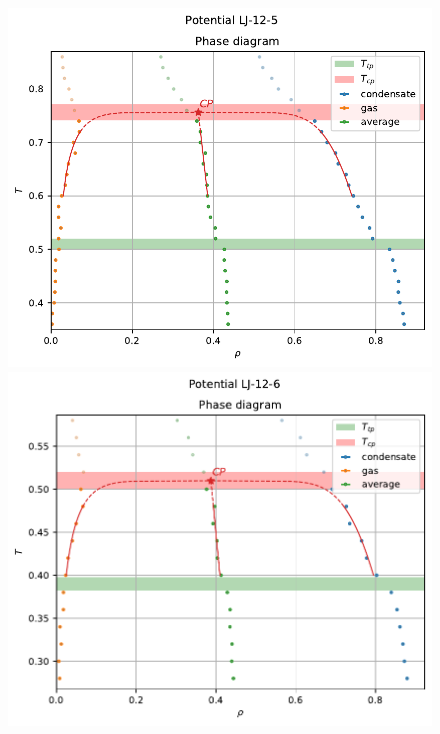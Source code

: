 \documentclass[pdf,hyperref={unicode}]{beamer}
\begin{document}
\begin{frame}
\begin{columns}
\begin{column}{0.55\linewidth}
\begin{figure}[h]
\begin{center}
\begin{minipage}[h]{0.47\linewidth}
\includegraphics[width=\textwidth, keepaspectratio]{plot_phase_diagram_Potential LJ-12-5_1}
\end{minipage}
\begin{minipage}[h]{0.47\linewidth}
\includegraphics[width=\textwidth, keepaspectratio]{plot_phase_diagram_Potential LJ-12-6_1}
\end{minipage}
\label{risPhaseDiagrammExp}
\end{center}
\end{figure}


\end{column}
\end{columns}
\end{frame}
\end{document}
